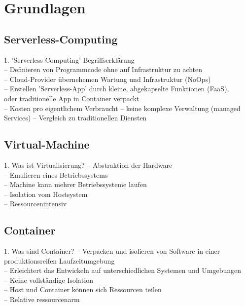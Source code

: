 \chapter{Grundlagen}

\section{Serverless-Computing}
1. 'Serverless Computing' Begriffserklärung\\
-- Definieren von Programmcode ohne auf Infrastruktur zu achten\\
-- Cloud-Provider übernehemen Wartung und Infrastruktur (NoOps)\\
-- Erstellen 'Serverless-App' durch kleine, abgekapselte Funktionen (FaaS),\\
oder traditionelle App in Container verpackt\\
-- Kosten pro eigentlichem Verbraucht
-- keine komplexe Verwaltung (managed Services)
-- Vergleich zu traditionellen Diensten


\section{Virtual-Machine}
1. Was ist Virtualisierung?
-- Abstraktion der Hardware\\
-- Emulieren eines Betriebssystems\\
-- Machine kann mehrer Betriebssysteme laufen\\
-- Isolation vom Hostsystem\\
-- Ressourcenintensiv\\

\section{Container}
1. Was sind Container?
-- Verpacken und isolieren von Software in einer produktionsreifen Laufzeitumgebung\\
-- Erleichtert das Entwickeln auf unterschiedlichen Systemen und Umgebungen\\
-- Keine vollständige Isolation\\
-- Host und Container können sich Ressourcen teilen\\
-- Relative ressourcenarm\\

